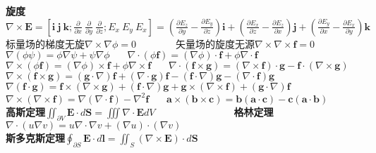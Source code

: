 \documentclass[10pt,a4paper]{article}
\begin{document}
\tiny\begin{multicols}{2}
\textbf{旋度}$\nabla\times\bm{E}=[\bm{i}~\bm{j}~\bm{k};\frac{\partial}{\partial x}~\frac{\partial}{\partial y}~\frac{\partial}{\partial z};E_x~E_y~E_x]=(\frac{\partial E_z}{\partial y}-\frac{\partial E_y}{\partial z})\bm{i}+(\frac{\partial E_x}{\partial z}-\frac{\partial E_z}{\partial x})\bm{j}+(\frac{\partial E_y}{\partial x}-\frac{\partial E_x}{\partial y})\bm{k}$\\
标量场的梯度无旋$\nabla\times\nabla\phi=0$~~~~~~~~矢量场的旋度无源$\nabla\times\nabla\times\bm{f}=0$\\
$\nabla(\phi\psi)=\phi\nabla\psi+\psi\nabla\phi~~~~~~~~\nabla\cdot(\phi\bm{f})=(\nabla\phi)\cdot\bm{f}+\phi\nabla\cdot\bm{f}$\\
$\nabla\times(\phi\bm{f})=(\nabla\phi)\times\bm{f}+\phi\nabla\times\bm{f}~~~~~~~~\nabla\cdot(\bm{f}\times\bm{g})=(\nabla\times\bm{f})\cdot\bm{g}-\bm{f}\cdot(\nabla\times\bm{g})$\\
$\nabla\times(\bm{f}\times\bm{g})=(\bm{g}\cdot\nabla)\bm{f}+(\nabla\cdot\bm{g})\bm{f}-(\bm{f}\cdot\nabla)\bm{g}-(\nabla\cdot\bm{f})\bm{g}$\\
$\nabla(\bm{f}\cdot\bm{g})=\bm{f}\times(\nabla\times\bm{g})+(\bm{f}\cdot\nabla)\bm{g}+\bm{g}\times(\nabla\times\bm{f})+(\bm{g}\cdot\nabla)\bm{f}$\\
$\nabla\times(\nabla\times\bm{f})=\nabla(\nabla\cdot\bm{f})-\nabla^2\bm{f}~~~~~~~~\bm{a}\times(\bm{b}\times\bm{c})=\bm{b}(\bm{a}\cdot\bm{c})-\bm{c}(\bm{a}\cdot\bm{b})$\\
\textbf{高斯定理}$\iint_{\partial V}\bm{E}\cdot d\bm{S}=\iiint\nabla\cdot\bm{E}dV$~~~~~~~~~~~~~~~~\textbf{格林定理}$\nabla\cdot(u\nabla v)=u\nabla\cdot\nabla v+(\nabla u)\cdot(\nabla v)$\\
\textbf{斯多克斯定理}$\oint_{\partial S}\bm{E}\cdot d\bm{l}=\iint_S(\nabla\times\bm{E})\cdot d\bm{S}$
\end{multicols}
\end{document}
